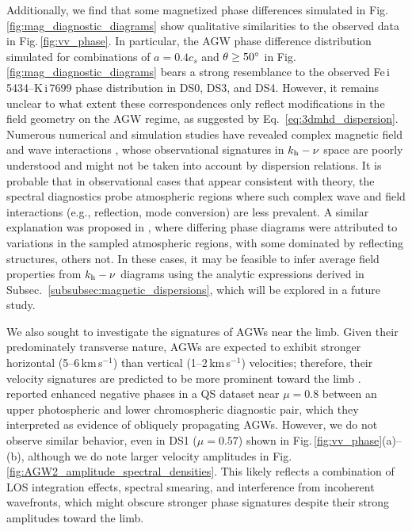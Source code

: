 \documentclass[preprint2,linenumbers]{aastex701}
\newcommand{\IBISFeUpperPhot}[1]{Fe\,{\sc i}\,5434}
\newcommand{\IBISK}[1]{K\,{\sc i}\,7699}
\begin{document}
Additionally, we find that some magnetized phase differences simulated in Fig.\,\ref{fig:mag_diagnostic_diagrams} show qualitative similarities to the observed data in Fig.\,\ref{fig:vv_phase}.
In particular, the AGW phase difference distribution simulated for combinations of $a = 0.4c_s$ and $\theta \geq 50\degree$ in Fig.\,\ref{fig:mag_diagnostic_diagrams} bears a strong resemblance to the observed \IBISFeUpperPhot{}--\IBISK{} phase distribution in DS0, DS3, and DS4.
However, it remains unclear to what extent these correspondences only reflect modifications in the field geometry on the AGW regime, as suggested by Eq.~\ref{eq:3dmhd_dispersion}. 
Numerous numerical and simulation studies have revealed complex magnetic field and wave interactions \citep[e.g.,][]{2003_Bogdan_Carlsson_etal}, whose observational signatures in $k_{\rm{h}}-\nu$ space are poorly understood and might not be taken into account by dispersion relations.
It is probable that in observational cases that appear consistent with theory, the spectral diagnostics probe atmospheric regions where such complex wave and field interactions (e.g., reflection, mode conversion) are less prevalent. A similar explanation was proposed in \citet{1992_Deubner, 1996_Deubner_Waldschik}, where differing phase diagrams were attributed to variations in the sampled atmospheric regions, with some dominated by reflecting structures, others not. In these cases, it may be feasible to infer average field properties from $k_{\rm{h}}-\nu$ diagrams using the analytic expressions derived in Subsec.~\ref{subsubsec:magnetic_dispersions}, which will be explored in a future study.

We also sought to investigate the signatures of AGWs near the limb.
Given their predominately transverse nature, AGWs are expected to exhibit stronger horizontal (5--6\,km\,s$^{-1}$) than vertical (1--2\,km\,s$^{-1}$) velocities; therefore, their velocity signatures are predicted to be more prominent toward the limb \citep{1981_Mihalas_Toomre}.
\citet{1992_Deubner} reported enhanced negative phases in a QS dataset near $\mu=0.8$ between an upper photospheric and lower chromospheric diagnostic pair, which they interpreted as evidence of obliquely propagating AGWs.
However, we do not observe similar behavior, even in DS1 ($\mu = 0.57$) shown in Fig.\,\ref{fig:vv_phase}(a)--(b), although we do note larger velocity amplitudes in Fig.\,\ref{fig:AGW2_amplitude_spectral_densities}.
This likely reflects a combination of LOS integration effects, spectral smearing, and interference from incoherent wavefronts, which might obscure stronger phase signatures despite their strong amplitudes toward the limb.
\end{document}
